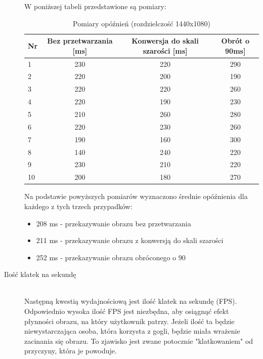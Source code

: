 \documentclass[a4paper,11pt,twoside]{report}
\theoremstyle{definition}
\begin{document}
\begin{description}
W poniższej tabeli przedstawione są pomiary:
\begin{table}[H]
\centering
\begin{tabular}{lccc}
Nr & Bez przetwarzania {[}ms{]} & Konwersja do skali szarości {[}ms{]} & Obrót o 90\textdegree {[}ms{]} \\ \hline
1  & 230                        & 220                                  & 290                            \\
2  & 220                        & 200                                  & 190                            \\
3  & 220                        & 220                                  & 260                            \\
4  & 220                        & 190                                  & 230                            \\
5  & 210                        & 260                                  & 280                            \\
6  & 220                        & 230                                  & 260                            \\
7  & 190                        & 160                                  & 300                            \\
8  & 140                        & 240                                  & 220                            \\
9  & 230                        & 210                                  & 220                            \\
10 & 200                        & 180                                  & 270                            
\end{tabular}
\caption{Pomiary opóźnień (rozdzielczość 1440x1080)}
\end{table}

Na podstawie powyższych pomiarów wyznaczono średnie opóźnienia dla każdego z tych trzech przypadków:

\begin{itemize}
\item 208 ms - przekazywanie obrazu bez przetwarzania 
\item 211 ms - przekazywanie obrazu z konwersją do skali szarości
\item 252 ms - przekazywanie obrazu obróconego o 90\textdegree
\end{itemize}


\item[Ilość klatek na sekundę] \hfill \\
Następną kwestią wydajnościową jest ilość klatek na sekundę (FPS). Odpowiednio wysoka ilość FPS jest niezbędna, aby osiągnąć efekt płynności obrazu, na który użytkownik patrzy. Jeżeli ilość ta będzie niewystarczająca osoba, która korzysta z gogli, będzie miała wrażenie zacinania się obrazu. To zjawisko jest zwane potocznie "klatkowaniem" od   przyczyny, która je powoduje.


\end{description}
\end{document}
